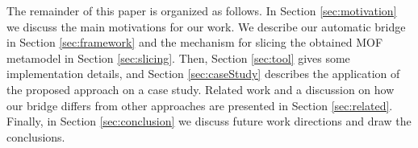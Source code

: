 The remainder of this paper is organized as follows. In Section \ref{sec:motivation} we discuss the main motivations for our work.
We describe our automatic bridge in Section \ref{sec:framework} and the mechanism for slicing the obtained MOF metamodel 
in Section \ref{sec:slicing}. 
Then, Section \ref{sec:tool} gives some implementation details, and Section \ref{sec:caseStudy} describes the application of
the proposed approach on a case study. Related work and a discussion on how our bridge differs from other approaches
are presented in Section \ref{sec:related}. 
Finally, in Section \ref{sec:conclusion} we discuss future work directions and draw the conclusions. 

















